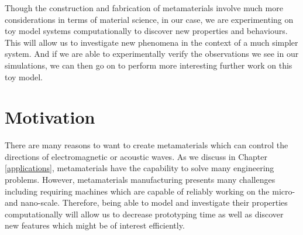 Though the construction and fabrication of metamaterials involve much more
considerations in terms of material science, in our case, we are experimenting
on toy model systems computationally to discover new properties and behaviours.
This will allow us to investigate new phenomena in the context of a much
simpler system. And if we are able to experimentally verify the observations we
see in our simulations, we can then go on to perform more interesting further
work on this toy model.

\section{Motivation}
There are many reasons to want to create metamaterials which can control the
directions of electromagnetic or acoustic waves. As we discuss in Chapter
\ref{applications}, metamaterials have the capability to solve many engineering
problems. However, metamaterials manufacturing presents many challenges
including requiring machines which are capable of reliably working on the
micro- and nano-scale.\cite{metamanu} Therefore, being able to model and
investigate their properties computationally will allow us to decrease
prototyping time as well as discover new features which might be of interest
efficiently.
